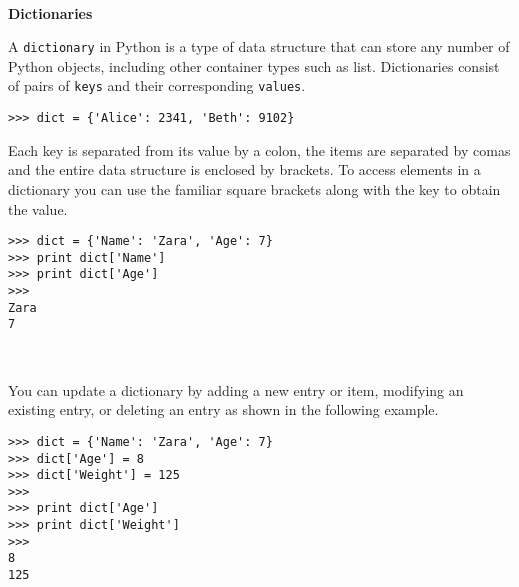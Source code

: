 \documentclass[letterpaper,11pt]{article}
\begin{document}
\\
\textbf{Dictionaries}
\par{A \texttt{dictionary} in Python is a type of data structure that can store
any number of Python objects, including other container types such as list.
Dictionaries consist of pairs of \texttt{keys} and their corresponding \texttt{values}.}
\\
\begin{minipage}{.5\textwidth}
    \begin{tcolorbox}
        \begin{footnotesize}
            \begin{verbatim}
>>> dict = {'Alice': 2341, 'Beth': 9102}
            \end{verbatim}
        \end{footnotesize}
    \end{tcolorbox}
\end{minipage}
\par{Each key is separated from its value by a colon, the items are separated by
comas and the entire data structure is enclosed by brackets. To access elements
in a dictionary you can use the familiar square brackets along with the key to
obtain the value.}
\\
\begin{minipage}{.5\textwidth}
    \begin{tcolorbox}
        \begin{footnotesize}
            \begin{verbatim}
>>> dict = {'Name': 'Zara', 'Age': 7}
>>> print dict['Name']
>>> print dict['Age']
>>>
Zara
7
            \end{verbatim}
        \end{footnotesize}
    \end{tcolorbox}
\end{minipage}
\\
\par{You can update a dictionary by adding a new entry or item, modifying an
existing entry, or deleting an entry as shown in the following example.}
\\
\begin{minipage}{.5\textwidth}
    \begin{tcolorbox}
        \begin{footnotesize}
            \begin{verbatim}
>>> dict = {'Name': 'Zara', 'Age': 7}
>>> dict['Age'] = 8
>>> dict['Weight'] = 125
>>>
>>> print dict['Age'] 
>>> print dict['Weight'] 
>>>
8
125
            \end{verbatim}
        \end{footnotesize}
    \end{tcolorbox}
\end{minipage}
\end{document}
